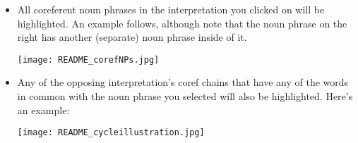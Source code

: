 \documentclass[a4paper]{article}
\begin{document}
\begin{itemize}
\item All coreferent noun phrases in the interpretation you clicked on will be highlighted. An example follows, although note that the noun phrase on the right has another (separate) noun phrase inside of it.

\texttt{[image: README\_corefNPs.jpg]}

\item Any of the opposing interpretation's coref chains that have any of the words in common with the noun phrase you selected will also be highlighted. Here's an example:

\texttt{[image: README\_cycleillustration.jpg]}

\end{itemize}
\end{document}
